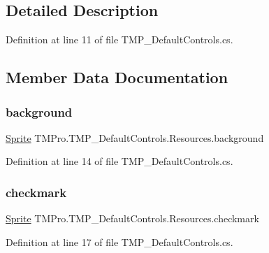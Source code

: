 \subsection{Detailed Description}


Definition at line 11 of file T\+M\+P\+\_\+\+Default\+Controls.\+cs.



\subsection{Member Data Documentation}
\mbox{\label{struct_t_m_pro_1_1_t_m_p___default_controls_1_1_resources_a05bed50721aec60ad69599a39779aca5}} 
\subsubsection{\texorpdfstring{background}{background}}
{\footnotesize\ttfamily \mbox{\hyperlink{namespace_t_m_pro_ab5662f47179bf1b81c575ecf80b24065a51f2b7b14433aa22c67d1f4fc18943cd}{Sprite}} T\+M\+Pro.\+T\+M\+P\+\_\+\+Default\+Controls.\+Resources.\+background}



Definition at line 14 of file T\+M\+P\+\_\+\+Default\+Controls.\+cs.

\mbox{\label{struct_t_m_pro_1_1_t_m_p___default_controls_1_1_resources_aded76c75ca1e7cbc0c2d990c52b1b3a2}} 
\subsubsection{\texorpdfstring{checkmark}{checkmark}}
{\footnotesize\ttfamily \mbox{\hyperlink{namespace_t_m_pro_ab5662f47179bf1b81c575ecf80b24065a51f2b7b14433aa22c67d1f4fc18943cd}{Sprite}} T\+M\+Pro.\+T\+M\+P\+\_\+\+Default\+Controls.\+Resources.\+checkmark}



Definition at line 17 of file T\+M\+P\+\_\+\+Default\+Controls.\+cs.

